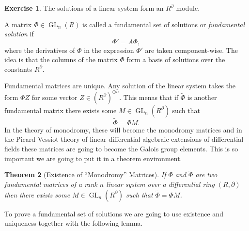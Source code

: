 \documentclass[12pt]{book}
\numberwithin{equation}{section}
\newtheorem{theorem}{Theorem}[subsection]
\theoremstyle{definition}
\newtheorem{exercise}[theorem]{Exercise}
\theoremstyle{remark}
\newcommand{\GL}{\operatorname{GL}}
\begin{document}
\begin{exercise}
	The solutions of a linear system form an $R^{\partial}$-module. 
\end{exercise}
 
A matrix $\Phi \in \GL_n(R)$ is called a fundamental set of solutions or \emph{fundamental solution} if 
 $$ \Phi' = A \Phi,$$
where the derivatives of $\Phi$ in the expression $\Phi'$ are taken component-wise. 
The idea is that the columns of the matrix $\Phi$ form a basis of solutions over the constants $R^{\partial}$.

Fundamental matrices are unique. 
Any solution of the linear system takes the form $\Phi Z$ for some vector $Z \in (R^{\partial})^{\oplus n}$. 
This menas that if $\widetilde{\Phi}$ is another fundamental matrix there exists some $M \in \GL_n(R^{\partial})$ such that
\begin{equation} \label{E:monodromy-matrix}
  \widetilde{\Phi} = \Phi M.
\end{equation}
In the theory of monodromy, these will become the monodromy matrices and in the Picard-Vessiot theory of linear differential algebraic extensions of differential fields these matrices are going to become the Galois group elements.
This is so important we are going to put it in a theorem environment. 
\begin{theorem}[Existence of ``Monodromy'' Matrices]
	If $\Phi$ and $\widetilde{\Phi}$ are two fundamental matrices of a rank $n$ linear system over a differential ring $(R,\partial)$ then there exists some $M \in \GL_n(R^{\partial})$ such that $\widetilde{\Phi} = \Phi M$.
\end{theorem}

To prove a fundamental set of solutions we are going to use existence and uniqueness together with the following lemma.
\end{document}
